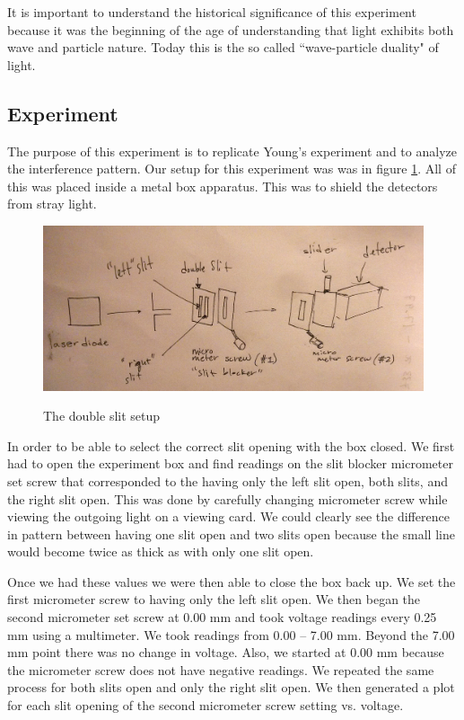 \documentclass[12pt letterpaper]{article}
\begin{document}
It is important to understand the historical significance of this experiment because it was the beginning of the age of understanding that light exhibits both wave and particle nature. Today this is the so called ``wave-particle duality" of light. 

\subsection*{Experiment}

The purpose of this experiment is to replicate Young's experiment and to analyze the interference pattern. Our setup for this experiment was was in figure \ref{fig:double_slit_setup}. All of this was placed inside a metal box apparatus. This was to shield the detectors from stray light. 

\begin{figure}[!ht]
  \caption{The double slit setup}
  \centering
    \includegraphics[width=\textwidth]{double_slit_setup.jpg}
    \label{fig:double_slit_setup}
\end{figure}


In order to be able to select the correct slit opening with the box closed. We first had to open the experiment box and find readings on the slit blocker micrometer set screw that corresponded to the having only the left slit open, both slits, and the right slit open. This was done by carefully changing micrometer screw while viewing the outgoing light on a viewing card. We could clearly see the difference in pattern between having one slit open and two slits open because the small line would become twice as thick as with only one slit open. 

Once we had these values we were then able to close the box back up. We set the first micrometer screw to having only the left slit open. We then began the second micrometer set screw at 0.00 mm and took voltage readings every 0.25 mm using a multimeter. We took readings from 0.00 -- 7.00 mm. Beyond the 7.00 mm point there was no change in voltage. Also, we started at 0.00 mm because the micrometer screw does not have negative readings. We repeated the same process for both slits open and only the right slit open. We then generated a plot for each slit opening of the second micrometer screw setting vs. voltage. 
\end{document}

